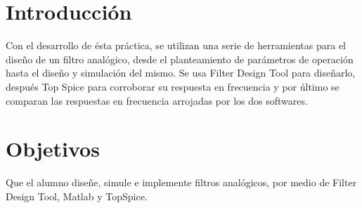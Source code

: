 \documentclass[12pt]{article}
\begin{document}

\newpage

\section{Introducción}
 Con el desarrollo de ésta práctica, se utilizan una serie de herramientas para el diseño de un
filtro analógico, desde el planteamiento de parámetros de operación hasta el diseño y simulación del
mismo. Se usa Filter Design Tool para diseñarlo, después Top Spice para corroborar su respuesta en frecuencia y por último se comparan las respuestas en frecuencia arrojadas por los dos softwares. 
\section{Objetivos}
Que el alumno diseñe, simule e implemente filtros analógicos, por medio de Filter Design Tool, Matlab y
TopSpice. 
\end{document}
